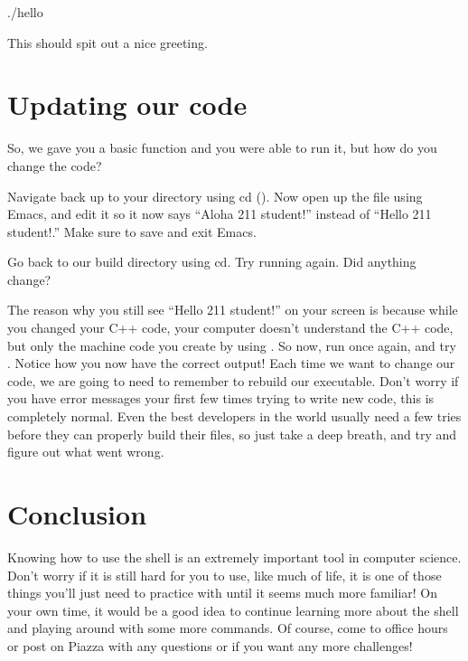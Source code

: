 \documentclass{tufte-handout}
\begin{document}
\begin{CmdLine}
  \prompt ./hello
\end{CmdLine}

\noindent
This should spit out a nice greeting.

\section{Updating our code}

So, we gave you a basic function and you were able to run it, but how do
you change the code?

Navigate back up to your  directory using cd
().  Now open up the  file using
Emacs, and edit it so it now says ``Aloha 211 student!'' instead of
``Hello 211 student!.'' Make sure to save and exit
Emacs.

Go back to our build directory using cd.  Try running 
again. Did anything change?

The reason why you still see ``Hello 211 student!'' on your screen is
because while you changed your C++ code, your computer doesn't
understand the C++ code, but only the machine code you create by using
.  So now, run  once again, and try
. Notice how you now have the correct output!  Each time
we want to change our code, we are going to need to remember to rebuild
our executable. Don't worry if you have error messages your first few
times trying to write new code, this is completely normal.  Even the
best developers in the world usually need a few tries before they can
properly build their files, so just take a deep breath, and try and
figure out what went wrong.

\section{Conclusion}

Knowing how to use the shell is an extremely important tool in computer
science. Don't worry if it is still hard for you to use, like much of
life, it is one of those things you'll just need to practice with until
it seems much more familiar!  On your own time, it would be a good idea
to continue learning more about the shell and playing around with some
more commands.
Of course, come to office hours or post on Piazza with any questions or
if you want any more challenges!
\end{document}
